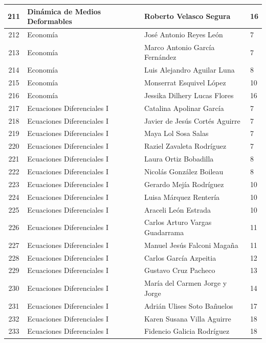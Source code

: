 {\begin{longtable}{|c|p{6.5cm}|p{5cm}|p{1.5cm}|}
  211 & Dinámica de Medios Deformables & Roberto Velasco Segura & 16 \\ \hline
  212 & Economía & José Antonio Reyes León & 7 \\ \hline
  213 & Economía & Marco Antonio García Fernández & 7 \\ \hline
  214 & Economía & Luis Alejandro Aguilar Luna & 8 \\ \hline
  215 & Economía & Monserrat Esquivel López & 10 \\ \hline
  216 & Economía & Jessika Dilhery Lucas Flores & 16 \\ \hline
  217 & Ecuaciones Diferenciales I & Catalina Apolinar García & 7 \\ \hline
  218 & Ecuaciones Diferenciales I & Javier de Jesús Cortés Aguirre & 7 \\ \hline
  219 & Ecuaciones Diferenciales I & Maya Lol Sosa Salas & 7 \\ \hline
  220 & Ecuaciones Diferenciales I & Raziel Zavaleta Rodríguez & 7 \\ \hline
  221 & Ecuaciones Diferenciales I & Laura Ortiz Bobadilla & 8 \\ \hline
  222 & Ecuaciones Diferenciales I & Nicolás González Boileau & 8 \\ \hline
  223 & Ecuaciones Diferenciales I & Gerardo Mejía Rodríguez & 10 \\ \hline
  224 & Ecuaciones Diferenciales I & Luisa Márquez Rentería & 10 \\ \hline
  225 & Ecuaciones Diferenciales I & Araceli León Estrada & 10 \\ \hline
  226 & Ecuaciones Diferenciales I & Carlos Arturo Vargas Guadarrama & 11 \\ \hline
  227 & Ecuaciones Diferenciales I & Manuel Jesús Falconi Magaña & 11 \\ \hline
  228 & Ecuaciones Diferenciales I & Carlos García Azpeitia & 12 \\ \hline
  229 & Ecuaciones Diferenciales I & Gustavo Cruz Pacheco & 13 \\ \hline
  230 & Ecuaciones Diferenciales I & María del Carmen Jorge y Jorge & 14 \\ \hline
  231 & Ecuaciones Diferenciales I & Adrián Ulises Soto Bañuelos & 17 \\ \hline
  232 & Ecuaciones Diferenciales I & Karen Susana Villa Aguirre & 18 \\ \hline
  233 & Ecuaciones Diferenciales I & Fidencio Galicia Rodríguez & 18 \\ \hline

\end{longtable}}
